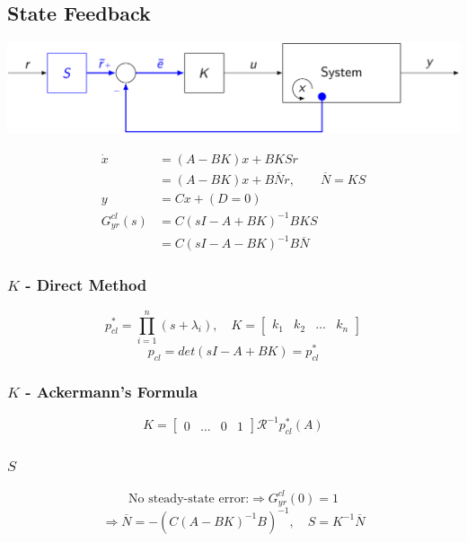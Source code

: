 \subsection{State Feedback}
\centerline{\includegraphics[width=0.95\linewidth]{src/3_state_feedback/images/state_feedback.jpeg}}
\begin{align*}
    \dot{x} &= (A-BK)x + BKSr\\
    &= (A-BK)x + B\overline{N}r, \qquad \overline{N} = KS\\
    y &= Cx + (D=0)\\[5pt]
    G_{yr}^{cl}(s) &= C(sI - A + BK)^{-1}BKS\\
    &= C(sI - A - BK)^{-1}B\overline{N}
\end{align*}

\subsubsection{$K$ - Direct Method}
$$
    p_{cl}^* = \prod_{i=1}^{n}(s + \lambda_i), \quad K = \begin{bmatrix} k_1 & k_2 & \hdots & k_n \end{bmatrix}
$$
$$
    p_{cl} = det(sI - A + BK) = p_{cl}^*
$$

\subsubsection{$K$ - Ackermann's Formula}
$$
    K = \begin{bmatrix} 0 & \hdots & 0 & 1 \end{bmatrix} \mathcal{R}^{-1}p_{cl}^*(A)
$$
\vspace*{0.1em}

\subsubsection{$S$}
$$
    \text{No steady-state error:} \Rightarrow G_{yr}^{cl}(0) = 1
$$
$$
    \Longrightarrow \overline{N} = - (C(A-BK)^{-1}B)^{-1}, \quad S = K^{-1}\overline{N}
$$
\vspace*{0.1em}